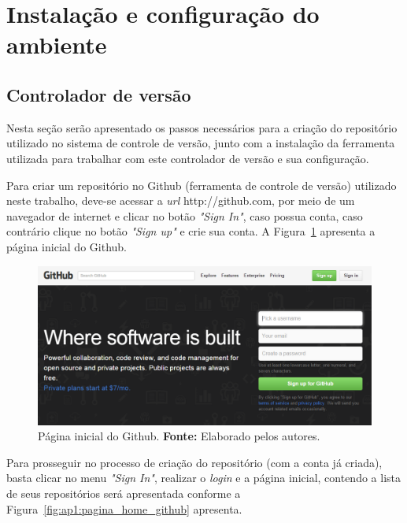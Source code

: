 \chapter*{Instalação e configuração do ambiente}
\label{apendice:1}

\section*{Controlador de versão}

Nesta seção serão apresentado os passos necessários para a criação do repositório utilizado no sistema de controle de versão, junto com a instalação da ferramenta utilizada para trabalhar com este controlador de versão e sua configuração.

Para criar um repositório no Github (ferramenta de controle de versão) utilizado neste trabalho, deve-se acessar a  \textit{url} http://github.com, por meio de um navegador de internet e clicar no botão \textit{"Sign In"}, caso possua conta, caso contrário clique no botão \textit{"Sign up"} e crie sua conta. A Figura~\ref{fig:ap1:pagina_inicial_github} apresenta a página inicial do Github.

\captionsetup[figure]{list=no}
\begin{figure}[h!]
	\centerline{\includegraphics[scale=0.55]{./imagens/apendices/pagina-inicial-github.png}}
	\caption[Página inicial do Github.]
	{Página inicial do Github. \textbf{Fonte:} Elaborado pelos autores.}
	\label{fig:ap1:pagina_inicial_github}
\end{figure}

Para prosseguir no processo de criação do repositório (com a conta já criada), basta clicar no menu \textit{"Sign In"}, realizar o \textit{login} e a página inicial, contendo a lista de seus repositórios será apresentada conforme a Figura~\ref{fig:ap1:pagina_home_github} apresenta.

